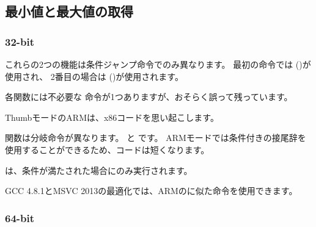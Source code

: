 ﻿\subsection{最小値と最大値の取得}

\subsubsection{32-bit}






これらの2つの機能は条件ジャンプ命令でのみ異なります。
最初の命令では ()が使用され、
2番目の場合は ()が使用されます。

\myindex{\CompilerAnomaly}
\label{MSVC_double_JMP_anomaly}

各関数には不必要な \JMP 命令が1つありますが、おそらく誤って残っています。


ThumbモードのARMは、x86コードを思い起こします。




関数は分岐命令が異なります。 と です。
ARMモードでは条件付きの接尾辞を使用することができるため、コードは短くなります。

は、条件が満たされた場合にのみ実行されます。



\Optimizing GCC 4.8.1とMSVC 2013の最適化では、ARMのに似た命令を使用できます。



\subsubsection{64-bit}

